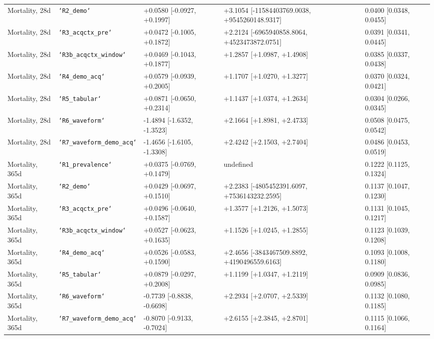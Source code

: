 \begin{table}[t]
\begin{tabular}{lllll}
Mortality, 28d & \texttt{`R2\_demo`} & +0.0580 [-0.0927, +0.1997] & +3.1054 [-11584403769.0038, +9545260148.9317] & 0.0400 [0.0348, 0.0455] \\
Mortality, 28d & \texttt{`R3\_acqctx\_pre`} & +0.0472 [-0.1005, +0.1872] & +2.2124 [-6965940858.8064, +4523473872.0751] & 0.0391 [0.0341, 0.0445] \\
Mortality, 28d & \texttt{`R3b\_acqctx\_window`} & +0.0469 [-0.1043, +0.1877] & +1.2857 [+1.0987, +1.4908] & 0.0385 [0.0337, 0.0438] \\
Mortality, 28d & \texttt{`R4\_demo\_acq`} & +0.0579 [-0.0939, +0.2005] & +1.1707 [+1.0270, +1.3277] & 0.0370 [0.0324, 0.0421] \\
Mortality, 28d & \texttt{`R5\_tabular`} & +0.0871 [-0.0650, +0.2314] & +1.1437 [+1.0374, +1.2634] & 0.0304 [0.0266, 0.0345] \\
Mortality, 28d & \texttt{`R6\_waveform`} & -1.4894 [-1.6352, -1.3523] & +2.1664 [+1.8981, +2.4733] & 0.0508 [0.0475, 0.0542] \\
Mortality, 28d & \texttt{`R7\_waveform\_demo\_acq`} & -1.4656 [-1.6105, -1.3308] & +2.4242 [+2.1503, +2.7404] & 0.0486 [0.0453, 0.0519] \\
Mortality, 365d & \texttt{`R1\_prevalence`} & +0.0375 [-0.0769, +0.1479] & undefined & 0.1222 [0.1125, 0.1324] \\
Mortality, 365d & \texttt{`R2\_demo`} & +0.0429 [-0.0697, +0.1510] & +2.2383 [-4805452391.6097, +7536143232.2595] & 0.1137 [0.1047, 0.1230] \\
Mortality, 365d & \texttt{`R3\_acqctx\_pre`} & +0.0496 [-0.0640, +0.1587] & +1.3577 [+1.2126, +1.5073] & 0.1131 [0.1045, 0.1217] \\
Mortality, 365d & \texttt{`R3b\_acqctx\_window`} & +0.0527 [-0.0623, +0.1635] & +1.1526 [+1.0245, +1.2855] & 0.1123 [0.1039, 0.1208] \\
Mortality, 365d & \texttt{`R4\_demo\_acq`} & +0.0526 [-0.0583, +0.1590] & +2.4656 [-3843467509.8892, +4190496559.6163] & 0.1093 [0.1008, 0.1180] \\
Mortality, 365d & \texttt{`R5\_tabular`} & +0.0879 [-0.0297, +0.2008] & +1.1199 [+1.0347, +1.2119] & 0.0909 [0.0836, 0.0985] \\
Mortality, 365d & \texttt{`R6\_waveform`} & -0.7739 [-0.8838, -0.6698] & +2.2934 [+2.0707, +2.5339] & 0.1132 [0.1080, 0.1185] \\
Mortality, 365d & \texttt{`R7\_waveform\_demo\_acq`} & -0.8070 [-0.9133, -0.7024] & +2.6155 [+2.3845, +2.8701] & 0.1115 [0.1066, 0.1164] \\

\end{tabular}
\end{table}

